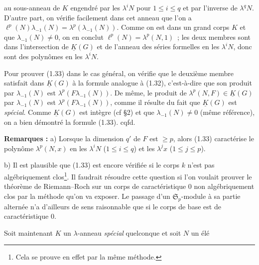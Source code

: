 au
sous-anneau de $K$ engendré par les $\lambda^iN$ pour $1\leq i\leq q$ et par l'inverse de $\lambda^qN$. D'autre part, on vérifie facilement dans cet anneau que l'on a $\ell^p(N)\lambda_{-1}(N)=\lambda^p(\lambda_{-1}(N))$. Comme on est dans un grand corps $K$ et que $\lambda_{-1}(N)\neq0$, on en conclut $\ell^p(N)=\lambda^p(N,1)$~; les deux membres sont dans l'intersection de $\underline{K}(G)$ et de l'anneau des séries formelles en les $\lambda^iN$, donc sont des polynômes en les $\lambda^iN$.

Pour prouver (1.33) dans le cas général, on vérifie que le deuxième membre satisfait dans $\underline{K}(G)$ à la formule analogue à (1.32), c'est-à-dire que son produit par $\lambda_{-1}(N)$ est $\lambda^p(F\lambda_{-1}(N))$. De même, le produit de $\lambda^p(N,F)\in \underline{K}(G)$ par $\lambda_{-1}(N)$ est $\lambda^p(F\lambda_{-1}(N))$, comme il résulte du fait que $\underline{K}(G)$ est \emph{spécial}. Comme $\underline{K}(G)$ est intègre (cf \S 2) et que $\lambda_{-1}(N)\neq0$ (même référence), on a bien démontré la formule (1.33). cqfd.

\textbf{Remarques :} a) Lorsque la dimension $q'$ de $F$ est $\geq p$, alors (1.33) caractérise le polynôme $\lambda^p(N,x)$ en les $\lambda^iN$ ($1\leq i\leq q$) et les $\lambda^jx$ ($1\leq j\leq p$).

b) Il est plausible que (1.33) est encore vérifiée si le corps $k$ n'est pas algébriquement clos\footnote{Cela se prouve en effet par la même méthode.}. Il faudrait résoudre cette question si l'on voulait prouver le théorème de Riemann--Roch sur un corps de caractéristique $0$ non algébriquement clos par la méthode qu'on va exposer. Le passage d'un $\mathfrak S_p$-module à sa partie alternée n'a d'ailleurs de sens raisonnable que si le corps de base est de caractéristique $0$.

Soit maintenant $K$ un $\lambda$-anneau \emph{spécial} quelconque et soit $N$ un
élé%
